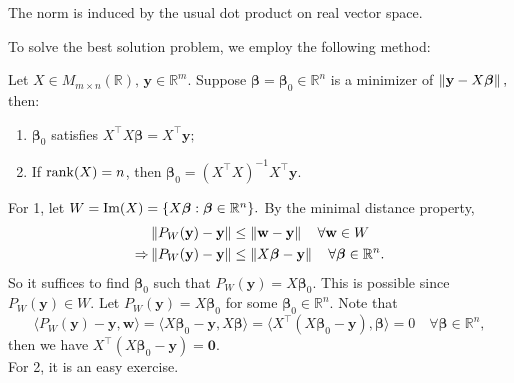 \documentclass[12pt]{article}
\begin{document}
\begin{remark}
    The norm is induced by the usual dot product on real vector space.
\end{remark}

To solve the best solution problem, we employ the following method:
\begin{theorem}
    Let $X\in M_{m\times n}(\mathbb{R}),\, \mathbf{y}\in\mathbb{R}^m.$ Suppose $\boldsymbol{\beta}=\boldsymbol{\beta}_0\in\mathbb{R}^n$ is a minimizer of $\left\lVert \mathbf{y}-X\boldsymbol{\beta} \right\rVert,$ then:
    \begin{enumerate}
        \item $\boldsymbol{\beta}_0$ satisfies $X^\top X\boldsymbol{\beta}=X^\top \mathbf{y};$
        \item If $\operatorname{rank}(X)=n$, then $\boldsymbol{\beta}_0=(X^\top X)^{-1}X^\top \mathbf{y}.$
    \end{enumerate}
\label{least square}
\end{theorem}

\begin{pfbox}
    For 1, let $W=\operatorname{Im}(X)=\{X\boldsymbol{\beta}:\boldsymbol{\beta}\in\mathbb{R}^n\}.$
    By the minimal distance property, 
    \begin{align*}
                &\left\lVert P_W(\mathbf{y})-\mathbf{y} \right\rVert\le\left\lVert \mathbf{w}-\mathbf{y} \right\rVert\quad\forall \mathbf{w}\in W\\
     \Rightarrow &\left\lVert P_W(\mathbf{y})-\mathbf{y} \right\rVert\le\left\lVert X\boldsymbol{\beta}-\mathbf{y} \right\rVert\quad\forall \boldsymbol{\beta}\in\mathbb{R}^n.
    \end{align*}
    So it suffices to find $\boldsymbol{\beta}_0$ such that $P_W(\mathbf{y})=X\boldsymbol{\beta}_0.$
    This is possible since $P_W(\mathbf{y})\in W.$
    Let $P_W(\mathbf{y})=X\boldsymbol{\beta}_0$ for some $\boldsymbol{\beta}_0\in\mathbb{R}^n.$
    Note that $$\langle P_W(\mathbf{y})-\mathbf{y}, \mathbf{w}\rangle = \langle X\boldsymbol{\beta}_0-\mathbf{y}, X\boldsymbol{\beta}\rangle = \langle X^\top (X\boldsymbol{\beta}_0-\mathbf{y}), \boldsymbol{\beta}\rangle=0\quad\forall \boldsymbol{\beta}\in\mathbb{R}^n,$$
    then we have $X^\top (X\boldsymbol{\beta}_0-\mathbf{y})=\mathbf{0}.$\\

    For 2, it is an easy exercise.
\end{pfbox}
\end{document}
